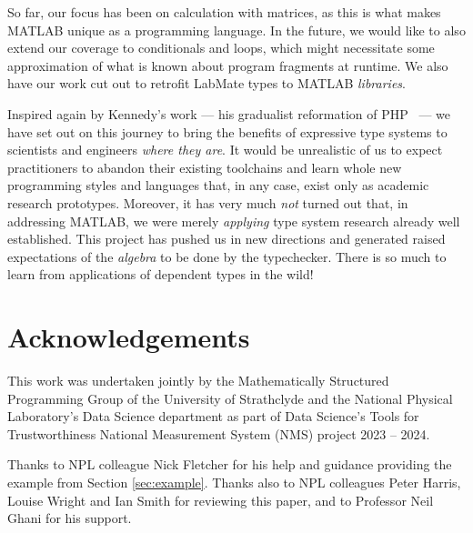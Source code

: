 \documentclass{IMEKO2024}
\newcommand{\remph}{\emph}
\begin{document}
So far, our focus has been on calculation with matrices, as this is what makes MATLAB
unique as a programming language.
%
In the future, we would like to also extend our coverage to
conditionals and loops, which might necessitate some approximation of
what is known about program fragments at runtime.
%
We also have our work cut out to retrofit LabMate types to MATLAB \remph{libraries}.

Inspired again by Kennedy's work --- his gradualist reformation of PHP~\cite{hack} ---
we have set out on this journey to bring the benefits of expressive type systems to scientists and engineers \remph{where they are}.
%
It would be unrealistic of us to expect practitioners to abandon their existing toolchains and learn whole new programming styles and languages that, in any case, exist only as academic research prototypes.
%
Moreover, it has very much \remph{not} turned out that, in addressing MATLAB, we were merely \remph{applying} type system research already well established.
%
This project has pushed us in new directions and generated raised expectations of the \remph{algebra} to be done by the typechecker.
%
There is so much to learn from applications of dependent types in the wild!

\section*{Acknowledgements}

This work was undertaken jointly by the Mathematically Structured Programming Group of the University of Strathclyde and the National Physical Laboratory’s Data Science department as part of Data Science’s Tools for Trustworthiness National Measurement System (NMS) project 2023 – 2024.

Thanks to NPL colleague Nick Fletcher for his help and guidance providing the example from Section \ref{sec:example}. Thanks also to NPL colleagues Peter Harris, Louise Wright and Ian Smith for reviewing this paper, and to Professor Neil Ghani for his support.

%


\end{document}
